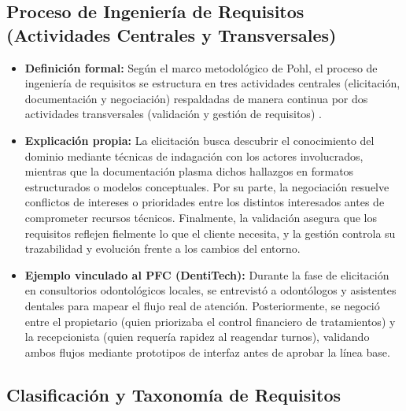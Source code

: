 \documentclass[11pt,a4paper]{article}
\begin{document}
\subsection{Proceso de Ingeniería de Requisitos (Actividades Centrales y Transversales)}

\begin{itemize}
    \item \textbf{Definición formal:} Según el marco metodológico de Pohl, el proceso de ingeniería de requisitos se estructura en tres actividades centrales (elicitación, documentación y negociación) respaldadas de manera continua por dos actividades transversales (validación y gestión de requisitos) \cite{pohl2025, ireb2023}.
    \item \textbf{Explicación propia:} La elicitación busca descubrir el conocimiento del dominio mediante técnicas de indagación con los actores involucrados, mientras que la documentación plasma dichos hallazgos en formatos estructurados o modelos conceptuales. Por su parte, la negociación resuelve conflictos de intereses o prioridades entre los distintos interesados antes de comprometer recursos técnicos. Finalmente, la validación asegura que los requisitos reflejen fielmente lo que el cliente necesita, y la gestión controla su trazabilidad y evolución frente a los cambios del entorno.
    \item \textbf{Ejemplo vinculado al PFC (DentiTech):} Durante la fase de elicitación en consultorios odontológicos locales, se entrevistó a odontólogos y asistentes dentales para mapear el flujo real de atención. Posteriormente, se negoció entre el propietario (quien priorizaba el control financiero de tratamientos) y la recepcionista (quien requería rapidez al reagendar turnos), validando ambos flujos mediante prototipos de interfaz antes de aprobar la línea base.
\end{itemize}

\subsection{Clasificación y Taxonomía de Requisitos}
\end{document}

